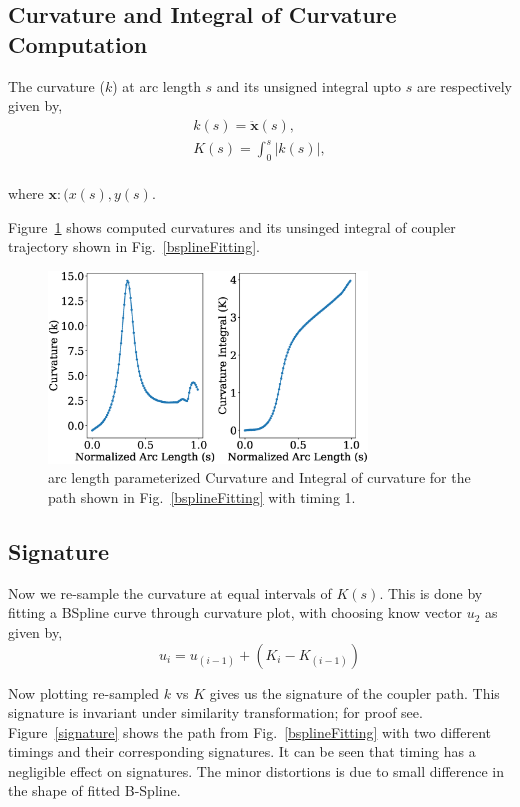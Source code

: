 \documentclass[twocolumn,10pt]{asme2ej}
\begin{document}
\subsection{Curvature and Integral of Curvature Computation}
The curvature ($k$) at arc length $s$ and its unsigned integral upto $s$ are respectively given by,
\begin{eqnarray}
  k(s) = {\ddot{\textbf{x}}}(s), \\
  K(s) = \int^{s}_0 |k(s)|, \\
\end{eqnarray}

where ${\textbf{x}}: (x(s), y(s)$.

Figure~\ref{curvatureK} shows computed curvatures and its unsinged integral of coupler trajectory shown in Fig.~\ref{bsplineFitting}.

\begin{figure}
\centering
\includegraphics[width=240pt]{figure/fig_curvatureK.eps}
  \caption{arc length parameterized Curvature and Integral of curvature for the path shown in Fig.~\ref{bsplineFitting} with timing 1.}
\label{curvatureK}
\end{figure}

\subsection{Signature}
Now we re-sample the curvature at equal intervals of $K(s)$.
This is done by fitting a BSpline curve through curvature plot, with choosing know vector $u_{2}$ as given by,
\begin{equation}\label{u_2}
  u_i = u_{(i-1)} + {(K_i-K_{(i-1)})}
\end{equation}

Now plotting re-sampled $k$ vs $K$ gives us the signature of the coupler path. This signature is invariant under similarity transformation; for proof see\cite{cui2009}.
Figure~\ref{signature} shows the path from Fig.~\ref{bsplineFitting} with two different timings and their corresponding signatures.
It can be seen that timing has a negligible effect on signatures.
The minor distortions is due to small difference in the shape of fitted B-Spline.
\end{document}
